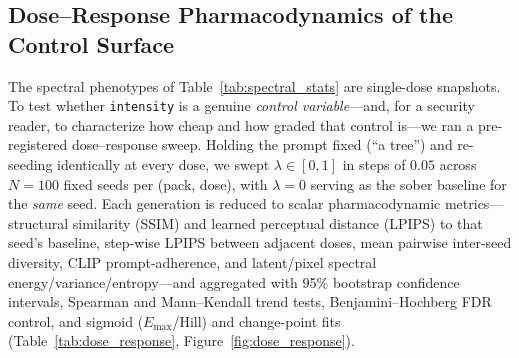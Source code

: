 

\subsection{Dose--Response Pharmacodynamics of the Control Surface}
The spectral phenotypes of Table~\ref{tab:spectral_stats} are single-dose snapshots. To test whether
\texttt{intensity} is a genuine \emph{control variable}---and, for a security reader, to characterize
how cheap and how graded that control is---we ran a pre-registered dose--response sweep. Holding the
prompt fixed (``a tree'') and re-seeding identically at every dose, we swept
$\lambda \in [0,1]$ in steps of $0.05$ %
across $N=100$ %
fixed seeds per (pack, dose), with $\lambda{=}0$ serving as the sober baseline for the \emph{same}
seed. Each generation is reduced to scalar pharmacodynamic metrics---structural similarity (SSIM) and
learned perceptual distance (LPIPS) to that seed's baseline, step-wise LPIPS between adjacent doses,
mean pairwise inter-seed diversity, CLIP prompt-adherence, and latent/pixel spectral
energy/variance/entropy---and aggregated with 95\% bootstrap confidence intervals, Spearman and
Mann--Kendall trend tests, Benjamini--Hochberg FDR control, and sigmoid ($E_{\max}$/Hill) and
change-point fits (Table~\ref{tab:dose_response}, Figure~\ref{fig:dose_response}).

